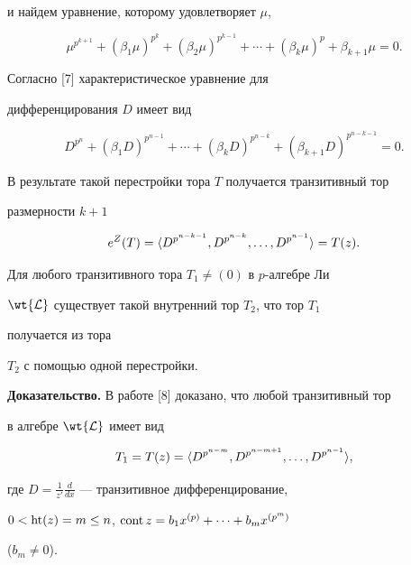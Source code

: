и найдем уравнение, которому удовлетворяет $\mu$, 


$$ 


\mu^{p^{k+1}}+(\beta_1\mu)^{p^k} 


+(\beta_2\mu)^{p^{k-1}}+\dotsb+ 


(\beta_k\mu)^p+\beta_{k+1}\mu=0. 


$$ 


Согласно [7] характеристическое уравнение для 


дифференцирования $D$ имеет вид 


$$ 


D^{p^n}+(\beta_1D)^{p^{n-1}}+\dotsb+ 


(\beta_k D)^{p^{n-k}}+(\beta_{k+1}D)^{p^{n-k-1}}=0. 


$$ 


В результате такой перестройки тора $T$ получается транзитивный тор 


размерности $k+1$ 


$$ 


e^Z(T)=\la D^{p^{n-k-1}},D^{p^{n-k}},\dotsc, 


D^{p^{n-1}}\ra=T(z). 


$$ 


 


\begin{thm} Для любого транзитивного тора $T_1\ne(0)$ в $p$-алгебре Ли 


$\wt{\cal L}$ существует такой внутренний тор $T_2$, что тор $T_1$ 


получается из тора 


$T_2$ с помощью одной перестройки. 


\end{thm} 


 


{\bf Доказательство.} В работе [8] доказано, что любой транзитивный тор 


в алгебре $\wt{\cal L}$ имеет вид 


$$ 


T_1=T(z)=\la D^{p^{n-m}},D^{p^{n-m+1}},\dotsc, 


D^{p^{n-1}}\ra, 


$$ 


где $D=\frac{1}{z'}\frac{d}{dx}$ --- транзитивное дифференцирование, 


$0<\operatorname{ht}(z)=m\le n$, $\operatorname{cont} z=b_1x^{(p)}+\dotsb+b_m x^{(p^m)}$ 


($b_m\ne 0$). 


